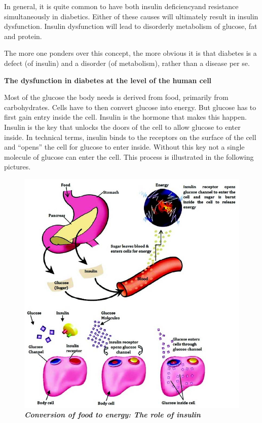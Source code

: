 In general, it is quite common to have both insulin deficiency\break and resistance simultaneously in diabetics. Either of these causes will ultimately result in insulin dysfunction. Insulin dysfunction will lead to disorderly metabolism of glucose, fat and protein.

The more one ponders over this concept, the more obvious it is that diabetes is a defect (of insulin) and a disorder (of metabolism), rather than a disease per se.

\noindent
\textbf{The dysfunction in diabetes at the level of the human cell}

Most of the glucose the body needs is derived from food, primarily from carbohydrates. Cells have to then convert glucose into energy. But glucose has to first gain entry inside the cell. Insulin is the hormone that makes this happen. Insulin is the key that unlocks the doors of the cell to allow glucose to enter inside. In technical terms, insulin binds to the receptors on the surface of the cell and “opens” the cell for glucose to enter inside. Without this key not a single molecule of glucose can enter the cell. This process is illustrated in the following pictures.

\begin{figure}[h]
\centering
\includegraphics[scale=2.3]{images/019.jpg}\\
\textbf{\textit{Conversion of food to energy: The role of insulin}}
\end{figure}

